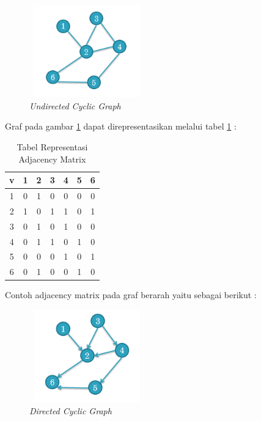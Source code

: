 \begin{figure} [H]
		\centering  
		\includegraphics[width=5cm, height=4cm]{adjacencymatrix} 
		\caption[\textit{Undirected Cyclic Graph}]{\textit{Undirected Cyclic Graph}}
		\label{fig:GambarAM} 
	\end{figure}


Graf pada gambar \ref{fig:GambarAM} dapat direpresentasikan melalui tabel \ref{tabelAM} :


\begin{table}[H]
\centering
\caption{Tabel Representasi Adjacency Matrix}
\begin{tabular}{|c|c|c|c|c|c|c|}
\hline
v & 1 & 2 & 3 & 4 & 5 & 6 \\
\hline
1 & 0 & 1 & 0 & 0 & 0 & 0 \\
\hline
2 & 1 & 0 & 1 & 1 & 0 & 1 \\
\hline
3 & 0 & 1 & 0 & 1 & 0 & 0 \\
\hline
4 & 0 & 1 & 1 & 0 & 1 & 0 \\
\hline
5 & 0 & 0 & 0 & 1 & 0 & 1 \\
\hline
6 & 0 & 1 & 0 & 0 & 1 & 0 \\
\hline
\end{tabular}
\label{tabelAM}
\end{table}

Contoh adjacency matrix pada graf berarah yaitu sebagai berikut :

\begin{figure} [H]
		\centering  
		\includegraphics[width=5cm, height=4cm]{graf3} 
		\caption[\textit{Directed Cyclic Graph}]{\textit{Directed Cyclic Graph}}
		\label{fig:GambarDCG} 
	\end{figure}
	
